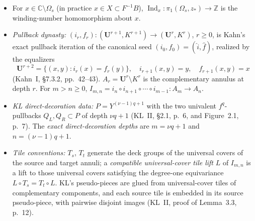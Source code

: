 \begin{itemize}
\item For \(x\in\mathbb C\setminus\Omega_s\) (in practice \(x\in X\subset F^{-1}B\)), \(\operatorname{Ind}_x\colon\pi_1(\Omega_s,z_*)\to\mathbb Z\) is the winding-number homomorphism about \(x\).
\item \emph{Pullback dynasty:} \((i_r,f_r)\colon(\mathbf U^{r+1},K^{r+1})\to(\mathbf U^r,K^r)\), \(r\ge0\), is Kahn's exact pullback iteration of the canonical seed \((i_0,f_0)=(\widehat i,\widehat f)\), realized by the equalizers
\[
 \mathbf U^{r+2}=\{(x,y):i_r(x)=f_r(y)\},
 \quad i_{r+1}(x,y)=y,\quad f_{r+1}(x,y)=x     \tag{2.1}
\]
(Kahn~I, \S7.3.2, pp.~42--43).  \(A_r=\mathbf U^r\setminus K^r\) is the complementary annulus at depth \(r\).  For \(m>n\ge0\),
\(I_{m,n}=i_n\circ i_{n+1}\circ\cdots\circ i_{m-1}\colon A_m\to A_n\).
\item \emph{KL direct-decoration data:} \(P=Y^{(\nu-1)q+1}\) with the two univalent \(f^q\)-pullbacks \(Q_L,Q_R\subset P\) of depth \(\nu q+1\) (KL~II, \S2.1, p.~6, and Figure~2.1, p.~7).  The \emph{exact direct-decoration depths} are \(m=\nu q+1\) and \(n=(\nu-1)q+1\).
\item \emph{Tile conventions:} \(T_s\), \(T_t\) generate the deck groups of the universal covers of the source and target annuli; a \emph{compatible universal-cover tile lift} \(L\) of \(I_{m,n}\) is a lift to those universal covers satisfying the degree-one equivariance \(L\circ T_s=T_t\circ L\).  KL's pseudo-pieces are glued from universal-cover tiles of complementary components, and each source tile is embedded in its source pseudo-piece, with pairwise disjoint images (KL~II, proof of Lemma~3.3, p.~12).
\end{itemize}